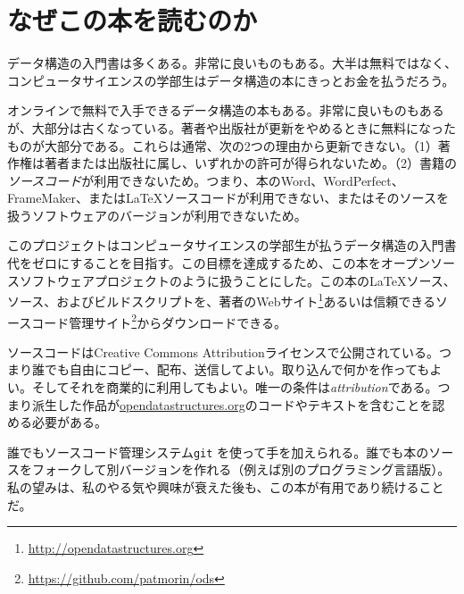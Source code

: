 \chapter*{なぜこの本を読むのか}

データ構造の入門書は多くある。非常に良いものもある。大半は無料ではなく、コンピュータサイエンスの学部生はデータ構造の本にきっとお金を払うだろう。

オンラインで無料で入手できるデータ構造の本もある。非常に良いものもあるが、大部分は古くなっている。著者や出版社が更新をやめるときに無料になったものが大部分である。これらは通常、次の2つの理由から更新できない。（1）著作権は著者または出版社に属し、いずれかの許可が得られないため。（2）書籍の\emph{ソースコード}が利用できないため。つまり、本のWord、WordPerfect、FrameMaker、または\LaTeX{}ソースコードが利用できない、またはそのソースを扱うソフトウェアのバージョンが利用できないため。

このプロジェクトはコンピュータサイエンスの学部生が払うデータ構造の入門書代をゼロにすることを目指す。この目標を達成するため、この本をオープンソースソフトウェアプロジェクトのように扱うことにした。この本の\LaTeX{}ソース、\lang{}ソース、およびビルドスクリプトを、著者のWebサイト\footnote {\url{http://opendatastructures.org}}あるいは信頼できるソースコード管理サイト\footnote {\url{https://github.com/patmorin/ods}}からダウンロードできる。

ソースコードはCreative Commons Attributionライセンスで公開されている。つまり誰でも自由にコピー、配布、送信してよい。取り込んで何かを作ってもよい。そしてそれを商業的に利用してもよい。唯一の条件は\emph{attribution}である。つまり派生した作品が\url{opendatastructures.org}のコードやテキストを含むことを認める必要がある。

誰でもソースコード管理システム\texttt{git} を使って手を加えられる。誰でも本のソースをフォークして別バージョンを作れる（例えば別のプログラミング言語版）。私の望みは、私のやる気や興味が衰えた後も、この本が有用であり続けることだ。
